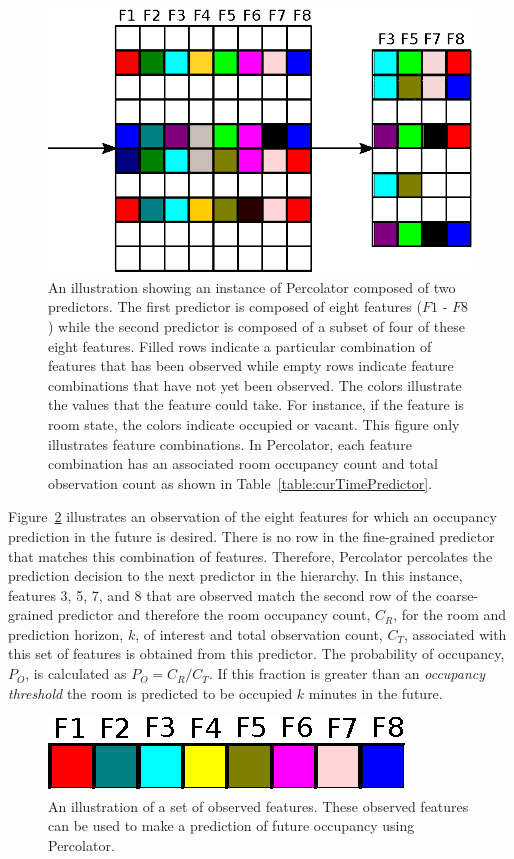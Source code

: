 \begin{figure}[!htb]
\begin{center}
\includegraphics[width=0.6\columnwidth]{fig/percolatorExample.eps}
\end{center}
\caption[Illustration of a Percolator model instance]{An illustration showing an
instance of Percolator composed of two predictors. The first predictor is
composed of eight features ($F1$ - $F8$) while the second predictor is composed
of a subset of four of these eight features. Filled rows indicate a particular
combination of features that has been observed while empty rows indicate feature
combinations that have not yet been observed. The colors illustrate the values
that the feature could take. For instance, if the feature is room state, the
colors indicate occupied or vacant. This figure only illustrates feature
combinations. In Percolator, each feature combination has an associated room
occupancy count and total observation count as shown in
Table~\ref{table:curTimePredictor}.}
\label{fig:percolatorExample}
\end{figure}

Figure~\ref{fig:observationExample} illustrates an observation of the eight
features for which an occupancy prediction in the future is desired. There is no
row in the fine-grained predictor that matches this combination of
features. Therefore, Percolator percolates the prediction decision to the next
predictor in the hierarchy. In this instance, features 3, 5, 7, and 8 that are
observed match the second row of the coarse-grained predictor and therefore the
room occupancy count, $C_R$, for the room and prediction horizon, $k$, of interest and
total observation count, $C_T$, associated with this set of features is obtained
from this predictor. The probability of occupancy, $P_O$, is calculated as $P_O
= C_R / C_T$. If this fraction is greater than an {\em occupancy threshold} the
room is predicted to be occupied $k$ minutes in the future.

\begin{figure}[!htb]
\begin{center}
\includegraphics[width=0.4\columnwidth]{fig/observationExample.eps}
\end{center}
\caption[Illustration of observed feature set]{An illustration of a set of
observed features. These observed features can be used to make a prediction of
future occupancy using Percolator.}
\label{fig:observationExample}
\end{figure}

